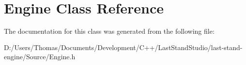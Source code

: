 \hypertarget{classEngine}{}\section{Engine Class Reference}
\label{classEngine}


The documentation for this class was generated from the following file\+:\begin{DoxyCompactItemize}
\item 
D\+:/\+Users/\+Thomas/\+Documents/\+Development/\+C++/\+Last\+Stand\+Studio/last-\/stand-\/engine/\+Source/Engine.\+h\end{DoxyCompactItemize}
